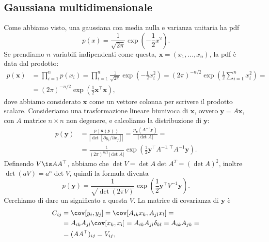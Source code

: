 
\subsection{Gaussiana multidimensionale}

Come abbiamo visto, una gaussiana con media nulla e varianza unitaria ha pdf
%
\begin{equation*}
    p(x) = \frac1{\sqrt{2\pi}}\exp\left(-\frac12 x^2\right).
\end{equation*}
%
Se prendiamo $n$ variabili indipendenti come questa, $\mathbf x = (x_1, \ldots,
x_n)$, la pdf è data dal prodotto:
%
\begin{align*}
    p(\mathbf x) &= \prod_{i=1}^n p(x_i)
    = \prod_{i=1}^n \frac1{\sqrt{2\pi}}\exp\left(-\frac12 x_i^2\right)
    = (2\pi)^{-n/2} \exp\left(\frac12 \sum_{i=1}^n x_i^2 \right) = \\
    &= (2\pi)^{-n/2} \exp\left(\frac12 \mathbf x^\top \mathbf x\right),
\end{align*}
%
dove abbiamo considerato $\mathbf x$ come un vettore colonna per scrivere il
prodotto scalare. Consideriamo una trasformazione lineare biunivoca di $\mathbf
x$, ovvero $\mathbf y = A\mathbf x$, con $A$ matrice $n\times n$ non degenere,
e calcoliamo la distribuzione di $\mathbf y$:
%
\begin{align*}
    p(\mathbf y) &= \frac{p(\mathbf x(\mathbf y))}
    {|\det [\partial y_i/\partial x_j]|}
    = \frac{p_{\mathbf x}(A^{-1}\mathbf y)}{|\det A|} = \\
    &= \frac1{(2\pi)^{n/2}|\det A|}
    \exp\left(\frac12 \mathbf y^\top A^{-1,\top} A^{-1} \mathbf y\right).
\end{align*}
%
Definendo $V \is AA^\top$, abbiamo che $\det V = \det A\det A^T = (\det A)^2$,
inoltre $\det(aV) = a^n\det V$, quindi la formula diventa
%
\begin{equation*}
    p(\mathbf y) = \frac1{\sqrt{\det(2\pi V)}}
    \exp\left(\frac12 \mathbf y^\top V^{-1} \mathbf y\right).
\end{equation*}
%
Cerchiamo di dare un significato a questa $V$. La matrice di covarianza di
$\mathbf y$ è
%
\begin{align*}
    C_{ij} &= \cov[y_i, y_j]
    = \cov[A_{ik} x_k, A_{jl} x_l] = \\
    &= A_{ik} A_{jl} \cov[x_k, x_l]
    = A_{ik} A_{jl} \delta_{kl}
    = A_{ik} A_{jk} = \\
    &= (AA^\top)_{ij} = V_{ij},
\end{align*}
